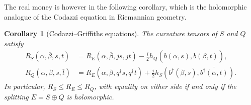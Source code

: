 \documentclass[10pt,a4paper]{article}
\newtheorem{coro}[theo]{Corollary}
\def\ov#1{\overline{#1}}
\begin{document}
The real money is however in the following corollary, which is the holomorphic analogue of the Codazzi equation in Riemannian geometry.


\begin{coro}[Codazzi--Griffiths equations]
\label{prop:codazzi-equation}
The curvature tensors of $S$ and $Q$ satisfy
\begin{align*}
R_S(\alpha, \ov\beta, s, \ov t)
&= R_E(\alpha, \ov\beta, js, \ov{jt})
- \tfrac i2 h_Q(b(\alpha, s), \ov{b(\beta, t)}),
\\
R_Q(\alpha, \ov\beta, s, \ov t)
&= R_E(\alpha, \ov\beta, q^\dagger s, \ov{q^\dagger t})
+ \tfrac i2 h_S(b^\dagger(\ov\beta, s), \ov{b^\dagger(\ov\alpha, t)}).
\end{align*}
In particular, $R_S \leq R_E \leq R_Q$, with equality on either side if and only if the splitting $E = S \oplus Q$ is holomorphic.
\end{coro}
\end{document}
